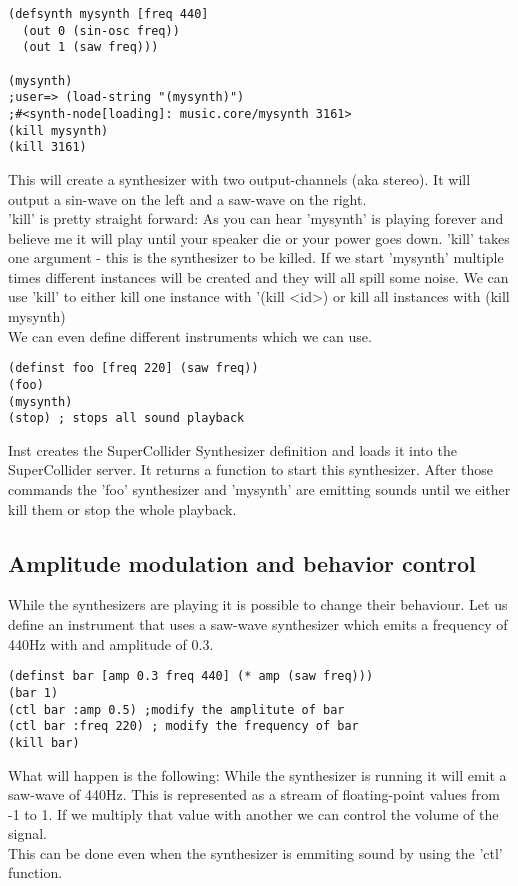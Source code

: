 \begin{lstlisting}
(defsynth mysynth [freq 440]
  (out 0 (sin-osc freq))
  (out 1 (saw freq)))

(mysynth)
;user=> (load-string "(mysynth)")
;#<synth-node[loading]: music.core/mysynth 3161>
(kill mysynth)
(kill 3161)
\end{lstlisting}
This will create a synthesizer with two output-channels (aka stereo). It will output a sin-wave on the left and a saw-wave on the right.\\ 'kill' is pretty straight forward: As you can hear 'mysynth' is playing forever and believe me it will play until your speaker die or your power goes down. 'kill' takes one argument - this is the synthesizer to be killed. If we start 'mysynth' multiple times different instances will be created and they will all spill some noise. We can use 'kill' to either kill one instance with '(kill <id>) or kill all instances with (kill mysynth)\\

We can even define different instruments which we can use.
\begin{lstlisting}
(definst foo [freq 220] (saw freq))
(foo)
(mysynth)
(stop) ; stops all sound playback
\end{lstlisting}
Inst creates the SuperCollider Synthesizer definition and loads it into the SuperCollider server. It returns a function to start this synthesizer. After those commands the 'foo' synthesizer and 'mysynth' are emitting sounds until we either kill them or stop the whole playback.

\subsection{Amplitude modulation and behavior control}
While the synthesizers are playing it is possible to change their behaviour. Let us define an instrument that uses a saw-wave synthesizer which emits a frequency of 440Hz with and amplitude of 0.3.
\begin{lstlisting}
(definst bar [amp 0.3 freq 440] (* amp (saw freq)))
(bar 1)
(ctl bar :amp 0.5) ;modify the amplitute of bar
(ctl bar :freq 220) ; modify the frequency of bar
(kill bar)
\end{lstlisting}
What will happen is the following: While the synthesizer is running it will emit a saw-wave of 440Hz. This is represented as a stream of floating-point values from -1 to 1. If we multiply that value with another we can control the volume of the signal.\\ This can be done even when the synthesizer is emmiting sound by using the 'ctl' function.

